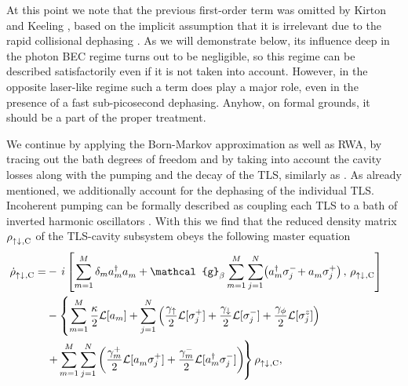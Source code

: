 \documentclass[12pt, a4paper]{iopart}
\begin{document}
%
At this point we note that the previous first-order term was omitted by Kirton and Keeling \cite{Keeling_PRL-nonequilibrium_model_photon-cond,Keeling-Thermalization_photon_condensate}{, based on the implicit assumption that it is irrelevant due to the rapid collisional dephasing \cite{KK_Private_comm}}. As we will demonstrate below, its influence deep in the photon BEC regime turns out to be negligible, so this regime can be described satisfactorily even if it is not taken into account. However, in the opposite laser-like regime such a term does play a major role, {even in the presence of a fast sub-picosecond dephasing.} Anyhow, on formal grounds, it should be a part of the proper treatment.

We continue by applying the Born-Markov approximation as well as RWA, by tracing out the bath degrees of freedom and by taking into account the cavity losses along with the pumping and the decay of the TLS, similarly as \cite{Keeling_PRL-nonequilibrium_model_photon-cond,Keeling-Thermalization_photon_condensate}. {As already mentioned, we additionally account for the dephasing of the individual TLS.} Incoherent pumping can be formally described as coupling each TLS to a bath of inverted harmonic oscillators \cite{Quantum-Noise}. With this we find that the reduced density matrix $\rho^{}_{\rm \uparrow\downarrow\:\!,C}$ of the TLS-cavity subsystem obeys the following master equation
%
\begin{eqnarray}\label{eq:FullME}
\hspace*{-0.5cm}
\dot\rho^{}_{\rm \uparrow\downarrow\:\!,C}=&-\,i\left[\sum_{m=1}^M\delta_m a_m^\dag a_m^{}
+ \mathcal{g}_\beta \sum_{m=1}^M\sum_{j=1}^N \!\left(a_m^\dag\sigma_j^-\! + a_m^{}\sigma_j^+\right), \,\rho^{}_{\rm \uparrow\downarrow\:\!,C}\right]\nonumber\\
\hspace*{-1.5cm}
&-\left\{\sum_{m=1}^M\frac{\kappa}{2}{\cal L}[a_m]
+\sum_{j=1}^N\left(\frac{\gamma_\uparrow}{2}{\cal L}[\sigma_j^+] + \frac{\gamma_\downarrow}{2}{\cal L}[\sigma_j^-] +
{\frac{\gamma_\phi}{2}{\cal L}[\sigma_j^z]}\right)\right.\nonumber\\
\hspace*{-1.5cm}
&\left.+\sum_{m=1}^M\sum_{j=1}^N\left(\frac{\gamma^+_m}{2}{\cal L}[a_m^{}\sigma_j^+] + \frac{\gamma^-_m}{2}{\cal L}[a_m^\dag\sigma_j^-]\right) \!\right\}\rho^{}_{\rm \uparrow\downarrow\:\!,C},
\end{eqnarray}
%
\end{document}
